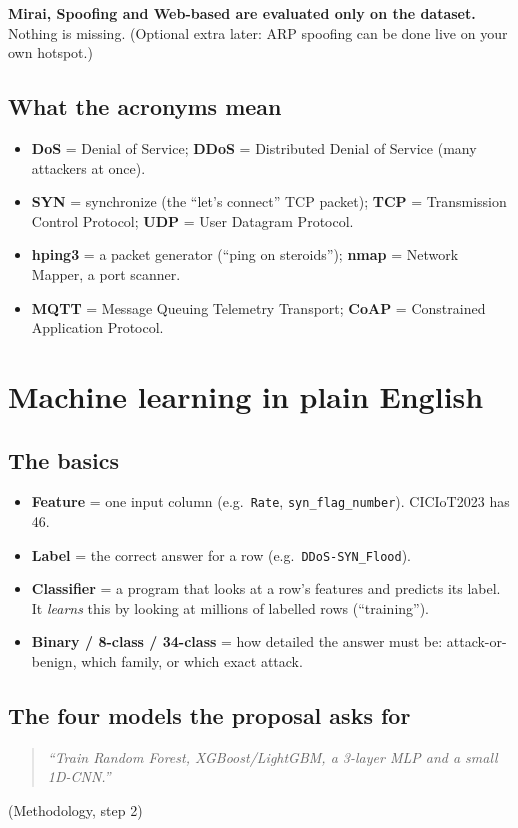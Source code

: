 \documentclass[11pt]{article}
\newcommand{\q}[1]{\begin{quote}\itshape ``#1''\end{quote}}
\begin{document}
\textbf{Mirai, Spoofing and Web-based are evaluated only on the dataset.} Nothing is missing.
(Optional extra later: ARP spoofing can be done live on your own hotspot.)

\subsection*{What the acronyms mean}
\begin{itemize}
\item \textbf{DoS} = Denial of Service; \textbf{DDoS} = Distributed Denial of Service (many attackers at once).
\item \textbf{SYN} = synchronize (the ``let's connect'' TCP packet); \textbf{TCP} = Transmission Control Protocol; \textbf{UDP} = User Datagram Protocol.
\item \textbf{hping3} = a packet generator (``ping on steroids''); \textbf{nmap} = Network Mapper, a port scanner.
\item \textbf{MQTT} = Message Queuing Telemetry Transport; \textbf{CoAP} = Constrained Application Protocol.
\end{itemize}

\newpage
\section{Machine learning in plain English}

\subsection*{The basics}
\begin{itemize}
\item \textbf{Feature} = one input column (e.g.\ \texttt{Rate}, \texttt{syn\_flag\_number}). CICIoT2023 has 46.
\item \textbf{Label} = the correct answer for a row (e.g.\ \texttt{DDoS-SYN\_Flood}).
\item \textbf{Classifier} = a program that looks at a row's features and predicts its label. It \emph{learns} this by looking at millions of labelled rows (``training'').
\item \textbf{Binary / 8-class / 34-class} = how detailed the answer must be: attack-or-benign, which family, or which exact attack.
\end{itemize}

\subsection*{The four models the proposal asks for}
\q{Train Random Forest, XGBoost/LightGBM, a 3-layer MLP and a small 1D-CNN.} (Methodology, step 2)
\end{document}
